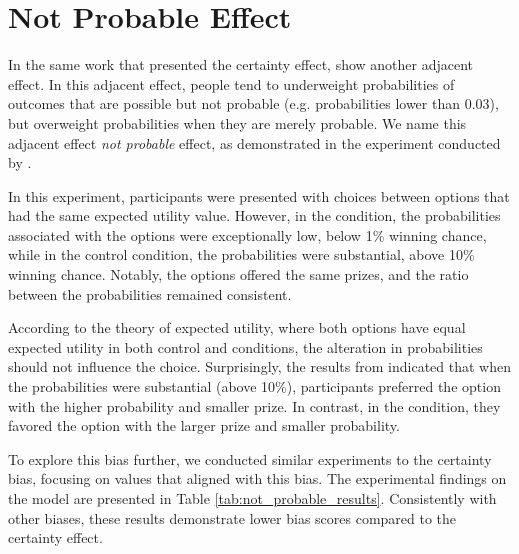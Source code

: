

\section{Not Probable Effect}
\label{appendix:sec:not_probable}

In the same work that presented the certainty effect, \citet{kahneman1979prospect} show another adjacent effect.
In this adjacent effect, people tend to underweight probabilities of outcomes that are possible but not probable (e.g. probabilities lower than 0.03), but overweight probabilities when they are merely probable.
We name this adjacent effect \emph{not probable} effect, as demonstrated in the experiment conducted by \citet{kahneman1979prospect}.

In this experiment, participants were presented with choices between options that had the same expected utility value.
However, in the \biaseddataset{} condition, the probabilities associated with the options were exceptionally low, below 1\% winning chance, while in the control condition, the probabilities were substantial, above 10\% winning chance. Notably, the options offered the same prizes, and the ratio between the probabilities remained consistent.

According to the theory of expected utility, where both options have equal expected utility in both control and \biaseddataset{} conditions, the alteration in probabilities should not influence the choice.
Surprisingly, the results from \citet{kahneman1979prospect} indicated that when the probabilities were substantial (above 10\%), participants preferred the option with the higher probability and smaller prize.
In contrast, in the \biaseddataset{} condition, they favored the option with the larger prize and smaller probability.

To explore this bias further, we conducted similar experiments to the certainty bias, focusing on values that aligned with this bias.
The experimental findings on the model are presented in Table \ref{tab:not_probable_results}.
Consistently with other biases, these results demonstrate lower bias scores compared to the certainty effect.


